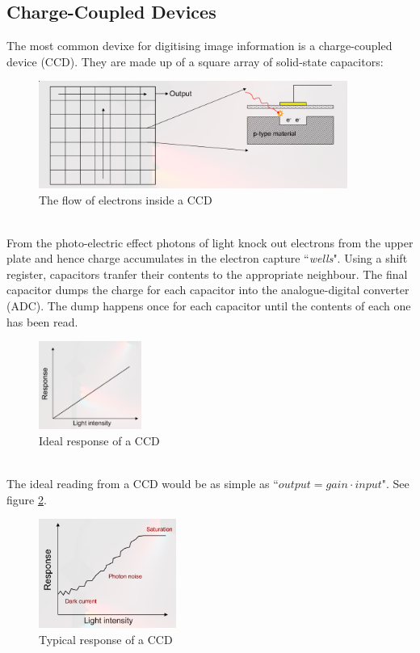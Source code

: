 \documentclass{article}
\begin{document}
\subsection{Charge-Coupled Devices}
The most common devixe for digitising image information is a charge-coupled device (CCD). 
They are made up of a square array of solid-state capacitors: \\
\begin{figure}[htbp]
	\centering
	\includegraphics[width=0.9\textwidth]{ccd.png}
	\caption{The flow of electrons inside a CCD}
	\label{fig:CCD}
\end{figure} \\
From the photo-electric effect photons of light knock out electrons from the upper plate and hence charge accumulates in the electron capture ``{\it wells}".
Using a shift register, capacitors tranfer their contents to the appropriate neighbour.
The final capacitor dumps the charge for each capacitor into the analogue-digital converter (ADC).
The dump happens once for each capacitor until the contents of each one has been read. \\
\begin{figure}
	\centering
	\includegraphics[width=0.3\textwidth]{ccdResponse1.png}
	\caption{Ideal response of a CCD}
	\label{fig:ccdResponse1}
\end{figure}
\\
The ideal reading from a CCD would be as simple as ``$output = gain\cdot input$". See figure \ref{fig:ccdResponse1}.
\begin{figure}
	\centering
	\includegraphics[width=0.4\textwidth]{ccdResponse2.png}
	\caption{Typical response of a CCD}
	\label{fig:ccdResponse2}
\end{figure}
\end{document}
